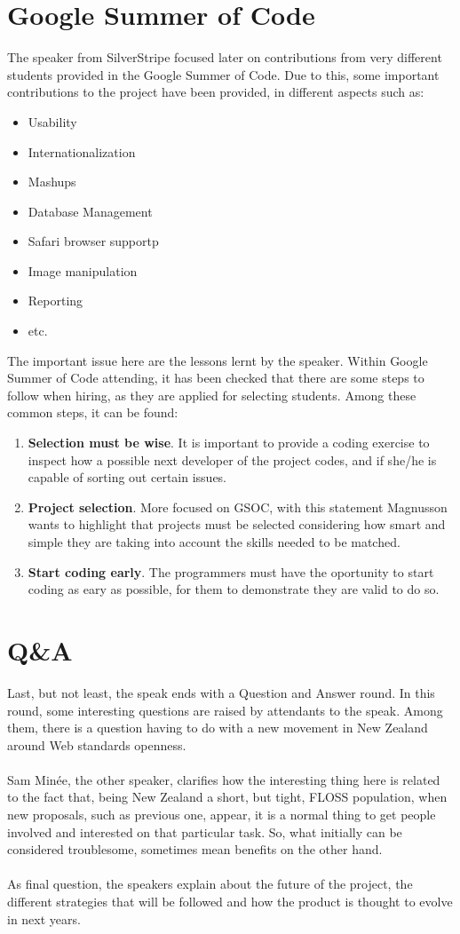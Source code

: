 \documentclass[11pt]{article}
\begin{document}
\section{Google Summer of Code}
The speaker from SilverStripe focused later on contributions from very different students provided in the Google Summer of Code. Due to this, some important contributions to the project have been provided, in different aspects such as:
\begin{itemize}\itemsep0pt
\item{Usability}
\item{Internationalization}
\item{Mashups}
\item{Database Management}
\item{Safari browser support}p
\item{Image manipulation}
\item{Reporting}
\item{etc.}
\end{itemize}
The important issue here are the lessons lernt by the speaker. Within Google Summer of Code attending, it has been checked that there are some steps to follow when hiring, as they are applied for selecting students. Among these common steps, it can be found:
\begin{enumerate}\itemsep0pt
\item{\textbf{Selection must be wise}}. It is important to provide a coding exercise to inspect how a possible next developer of the project codes, and if she/he is capable of sorting out certain issues.
\item{\textbf{Project selection}}. More focused on GSOC, with this statement Magnusson wants to highlight that projects must be selected considering how smart and simple they are taking into account the skills needed to be matched.
\item{\textbf{Start coding early}}. The programmers must have the oportunity to start coding as eary as possible, for them to demonstrate they are valid to do so.
\end{enumerate}

\section{Q\&A}
  Last, but not least, the speak ends with a Question and Answer round. In this round, some interesting questions are raised by attendants to the speak. Among them, there is a question having to do with a new movement in New Zealand around Web standards openness.\\
\\
  Sam Minée, the other speaker, clarifies how the interesting thing here is related to the fact that, being New Zealand a short, but tight, FLOSS population, when new proposals, such as previous one, appear, it is a normal thing to get people involved and interested on that particular task. So, what initially can be considered troublesome, sometimes mean benefits on the other hand.\\
\\
As final question, the speakers explain about the future of the project, the different strategies that will be followed and how the product is thought to evolve in next years.


{}
\end{document}
